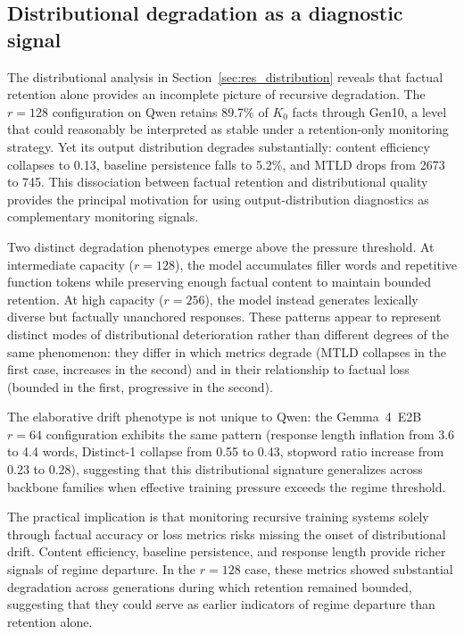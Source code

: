 \documentclass[a4paper,fleqn]{cas-dc}
\begin{document}
\subsection{Distributional degradation as a diagnostic signal}\label{sec:disc_drift}

The distributional analysis in Section~\ref{sec:res_distribution} reveals that
factual retention alone provides an incomplete picture of recursive degradation.
The $r=128$ configuration on Qwen retains 89.7\% of $K_0$ facts through Gen10,
a level that could reasonably be interpreted as stable under a retention-only
monitoring strategy. Yet its output distribution degrades substantially: content
efficiency collapses to 0.13, baseline persistence falls to 5.2\%, and MTLD
drops from 2673 to 745. This dissociation between factual retention and
distributional quality provides the principal motivation for using
output-distribution diagnostics as complementary monitoring signals.

Two distinct degradation phenotypes emerge above the pressure threshold. At
intermediate capacity ($r=128$), the model accumulates filler words and
repetitive function tokens while preserving enough factual content to maintain
bounded retention. At high capacity ($r=256$), the model instead generates
lexically diverse but factually unanchored responses. These patterns appear to
represent distinct modes of distributional deterioration rather than different
degrees of the same phenomenon: they differ in which metrics degrade (MTLD
collapses in the first case, increases in the second) and in their relationship
to factual loss (bounded in the first, progressive in the second).

The elaborative drift phenotype is not unique to Qwen: the Gemma~4~E2B $r=64$
configuration exhibits the same pattern (response length inflation from 3.6 to
4.4 words, Distinct-1 collapse from 0.55 to 0.43, stopword ratio increase from
0.23 to 0.28), suggesting that this distributional signature generalizes across
backbone families when effective training pressure exceeds the regime threshold.

The practical implication is that monitoring recursive training systems solely
through factual accuracy or loss metrics risks missing the onset of
distributional drift. Content efficiency, baseline persistence, and response
length provide richer signals of regime departure. In the $r=128$ case, these
metrics showed substantial degradation across generations during which retention
remained bounded, suggesting that they could serve as earlier indicators of
regime departure than retention alone.
\end{document}
